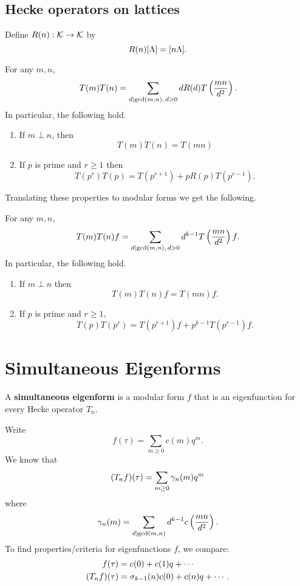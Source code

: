 \subsection{Hecke operators on lattices}
\begin{df}
Define $R(n):\cal K\to \cal K$ by
\[
R(n)[\La]=[n\La].
\]
\end{df}
\begin{thm}
For any $m,n$,
\[
T(m)T(n)=\sum_{d\mid \gcd(m,n),\,d>0} dR(d)T\pf{mn}{d^2}.
\]
In particular, the following hold.
\begin{enumerate}
\item
If $m\perp n$, then
\[
T(m)T(n)=T(mn)
\]
\item If $p$ is prime and $r\ge 1$ then
\[
T(p^r)T(p)=T(p^{r+1})+pR(p)T(p^{r-1}).
\]
\end{enumerate}
\end{thm}
Translating these properties to modular forms we get the following.
\begin{thm}
For any $m,n$,
\[
T(m)T(n)f=\sum_{d\mid \gcd(m,n),\,d>0} d^{k-1} T\pf{mn}{d^2}f.
\]
In particular, the following hold.
\begin{enumerate}
\item
If $m\perp n$ then 
\[
T(m)T(n)f=T(mn)f.
\]
\item 
If $p$ is prime and $r\ge 1$,
\[
T(p)T(p^r)=T(p^{r+1})f+p^{k-1}T(p^{r-1})f.
\]
\end{enumerate}
\end{thm}
\section{Simultaneous Eigenforms}
\begin{df}
A \textbf{simultaneous eigenform} is a modular form $f$ that is an eigenfunction for every Hecke operator $T_n$. 
\end{df}
Write
\[
f(\tau)=\sum_{m\ge 0} c(m)q^m.
\]
We know that
\[
(T_nf)(\tau)=\sum_{m\ge 0} \ga_n(m)q^m
\]
where
\[
\ga_n(m)=\sum_{d\mid \gcd(m,n)} d^{k-1} c\pf{mn}{d^2}.
\]
To find properties/criteria for eigenfunctions $f$, we compare:
\begin{align}
f(\tau)&=c(0)+c(1)q+\cdots\label{ef1}\\
(T_nf)(\tau)&=\si_{k-1}(n)c(0)+c(n)q+\cdots.\label{ef2}
\end{align}

